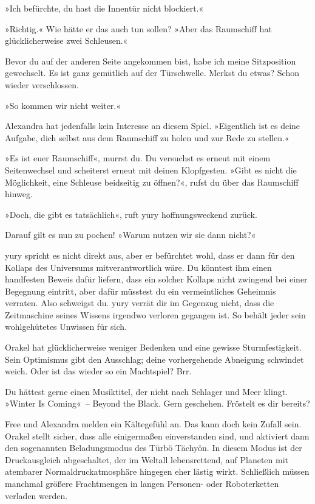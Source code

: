 »Ich befürchte, du hast die Innentür nicht blockiert.«

»Richtig.« Wie hätte er das auch tun sollen? »Aber das Raumschiff hat glücklicherweise zwei Schleusen.«

Bevor du auf der anderen Seite angekommen bist, habe ich meine Sitzposition gewechselt. Es ist ganz gemütlich auf der Türschwelle. Merkst du etwas? Schon wieder verschlossen.

»So kommen wir nicht weiter.«

Alexandra hat jedenfalls kein Interesse an diesem Spiel. »Eigentlich ist es deine Aufgabe, dich selbst aus dem Raumschiff zu holen und zur Rede zu stellen.«

»Es ist euer Raumschiff«, murrst du. Du versuchst es erneut mit einem Seitenwechsel und scheiterst erneut mit deinen Klopfgesten. »Gibt es nicht die Möglichkeit, eine Schleuse beidseitig zu öffnen?«, rufst du über das Raumschiff hinweg.

»Doch, die gibt es tatsächlich«, ruft yury hoffnungsweckend zurück.

Darauf gilt es nun zu pochen! »Warum nutzen wir sie dann nicht?«

yury spricht es nicht direkt aus, aber er befürchtet wohl, dass er dann für den Kollaps des Universums mitverantwortlich wäre. Du könntest ihm einen handfesten Beweis dafür liefern, dass ein solcher Kollaps nicht zwingend bei einer Begegnung eintritt, aber dafür müsstest du ein vermeintliches Geheimnis verraten. Also schweigst du. yury verrät dir im Gegenzug nicht, dass die Zeitmaschine seines Wissens irgendwo verloren gegangen ist. So behält jeder sein wohlgehütetes Unwissen für sich.

Orakel hat glücklicherweise weniger Bedenken und eine gewisse Sturmfestigkeit. Sein Optimismus gibt den Ausschlag; deine vorhergehende Abneigung schwindet weich. Oder ist das wieder so ein Machtspiel? Brr.

Du hättest gerne einen Musiktitel, der nicht nach Schlager und Meer klingt. »Winter Is Coming«~– Beyond the Black. Gern geschehen. Fröstelt es dir bereits?

Free und Alexandra melden ein Kältegefühl an. Das kann doch kein Zufall sein. Orakel stellt sicher, dass alle einigermaßen einverstanden sind, und aktiviert dann den sogenannten Beladungsmodus des Türbö Tächyön. In diesem Modus ist der Druckausgleich abgeschaltet, der im Weltall lebensrettend, auf Planeten mit atembarer Normaldruckatmosphäre hingegen eher lästig wirkt. Schließlich müssen manchmal größere Frachtmengen in langen Personen- oder Roboterketten verladen werden.

